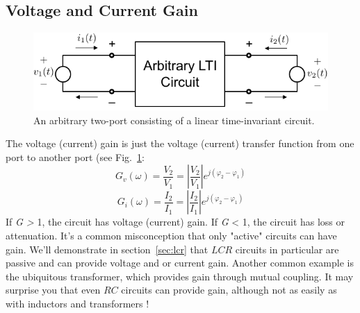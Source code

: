 \subsection{Voltage and Current Gain}
\begin{figure}[tb]
\begin{center}
\includegraphics[width=.6\columnwidth]{mod1_3_1_twoport}
\end{center}
\caption{An arbitrary two-port consisting of a linear time-invariant circuit.}
\label{fig:twoportivgain}
\end{figure}
The voltage (current) gain is just the voltage (current) transfer function from one port to another port (see Fig.~\ref{fig:twoportivgain}:
    \begin{equation}
        {G_v}(\omega ) = \frac{{{V_2}}}{{{V_1}}} = \left| {\frac{{{V_2}}}{{{V_1}}}} \right|{e^{j({\varphi _2} - {\varphi _1})}}
    \end{equation}
    \begin{equation}
        {G_i}(\omega ) = \frac{{{I_2}}}{{{I_1}}} = \left| {\frac{{{I_2}}}{{{I_1}}}} \right|{e^{j({\varphi _2} - {\varphi _1})}}
    \end{equation}
If \textit{G > }1, the circuit has voltage (current) gain.   If \textit{G} < 1, the circuit has loss or attenuation.   It's a common misconception that only "active" circuits can have gain.  We'll demonstrate in section~\ref{sec:lcr} that $LCR$ circuits in particular are passive and can provide voltage and or current gain.  Another common example is the ubiquitous transformer, which provides gain through mutual coupling.  It may surprise you that even $RC$ circuits can provide gain, although not as easily as with inductors and transformers !
